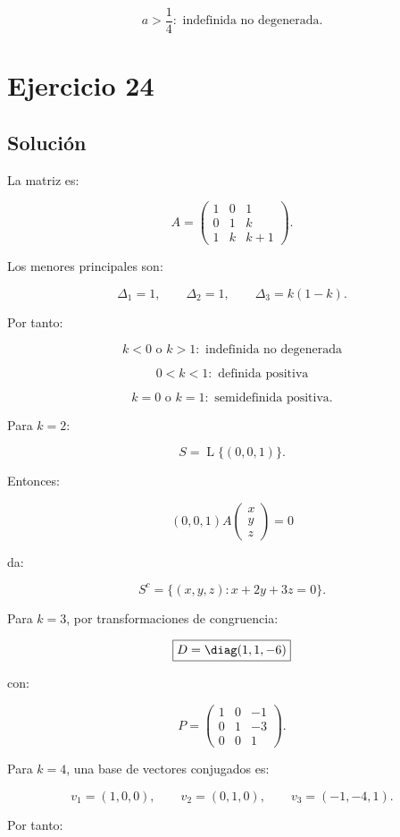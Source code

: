 \documentclass[11pt,a4paper]{article}
\newcommand{\Span}{\operatorname{L}}
\begin{document}
\[
\boxed{
a>\frac14:
\text{ indefinida no degenerada}.
}
\]

\section{Ejercicio 24}
\subsection{Solución}

La matriz es:

\[
\boxed{
A=
\begin{pmatrix}
1&0&1\\
0&1&k\\
1&k&k+1
\end{pmatrix}.
}
\]

Los menores principales son:

\[
\Delta_1=1,
\qquad
\Delta_2=1,
\qquad
\Delta_3=k(1-k).
\]

Por tanto:

\[
\boxed{
k<0\text{ o }k>1:
\text{ indefinida no degenerada}
}
\]

\[
\boxed{
0<k<1:
\text{ definida positiva}
}
\]

\[
\boxed{
k=0\text{ o }k=1:
\text{ semidefinida positiva}.
}
\]

Para $k=2$:

\[
S=\Span\{(0,0,1)\}.
\]

Entonces:

\[
(0,0,1)A
\begin{pmatrix}x\\y\\z\end{pmatrix}
=0
\]

da:

\[
\boxed{
S^c=
\{(x,y,z):x+2y+3z=0\}.
}
\]

Para $k=3$, por transformaciones de congruencia:

\[
\boxed{
D=\diag(1,1,-6)
}
\]

con:

\[
\boxed{
P=
\begin{pmatrix}
1&0&-1\\
0&1&-3\\
0&0&1
\end{pmatrix}.
}
\]

Para $k=4$, una base de vectores conjugados es:

\[
v_1=(1,0,0),
\qquad
v_2=(0,1,0),
\qquad
v_3=(-1,-4,1).
\]

Por tanto:
\end{document}
